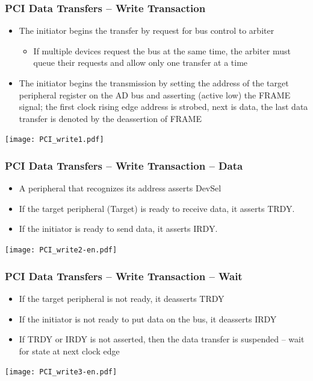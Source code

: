 \documentclass{beamer}
\begin{document}
\begin{frame}
\frametitle{PCI Data Transfers -- Write Transaction}

\begin{itemize}
\item The initiator begins the transfer by request for bus control to arbiter
\begin{itemize}
\item If multiple devices request the bus at the same time, the arbiter must queue their requests and allow only one transfer at a time
\end{itemize}
\item The initiator begins the transmission by setting the address of the target peripheral register on the AD bus and asserting (active low) the FRAME signal; the first clock rising edge address is strobed, next is data, the last data transfer is denoted by the deassertion of FRAME
\end{itemize}

\texttt{[image: PCI\_write1.pdf]}

\end{frame}

\begin{frame}
\frametitle{PCI Data Transfers -- Write Transaction -- Data}

\begin{itemize}
\item A peripheral that recognizes its address asserts DevSel
\item If the target peripheral (Target) is ready to receive data, it asserts TRDY.
\item If the initiator is ready to send data, it asserts IRDY.
\end{itemize}

\texttt{[image: PCI\_write2-en.pdf]}

\end{frame}


\begin{frame}
\frametitle{PCI Data Transfers -- Write Transaction -- Wait}

\begin{itemize}
\item If the target peripheral is not ready, it deasserts TRDY
\item If the initiator is not ready to put data on the bus, it deasserts IRDY
\item If TRDY or IRDY is not asserted, then the data transfer is suspended -- wait for state at next clock edge
\end{itemize}

\texttt{[image: PCI\_write3-en.pdf]}

\end{frame}
\end{document}
